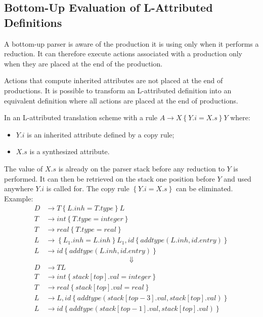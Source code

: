 \subsection{Bottom-Up Evaluation of L-Attributed Definitions}
A bottom-up parser is aware of the production it is using only when it performs a reduction.
It can therefore execute actions associated with a production only when they are placed at the end of the production.

Actions that compute inherited attributes are not placed at the end of productions.
It is possible to transform an L-attributed definition into an equivalent definition where all actions are placed at the end of productions.

In an L-attributed translation scheme with a rule $A \to X\left\{Y.i = X.s\right\}Y$ where:
\begin{itemize}
	\item $Y.i$ is an inherited attribute defined by a copy rule;
	\item $X.s$ is a synthesized attribute.
\end{itemize}
The value of $X.s$ is already on the parser stack before any reduction to $Y$ is performed.
It can then be retrieved on the stack one position before $Y$ and used anywhere $Y.i$ is called for.
The copy rule $\left\{Y.i = X.s\right\}$ can be eliminated.
Example:
\begin{align*}
	D &\to T \left\{L.inh = T.type\right\}L \\
	T &\to int \left\{T.type = integer\right\} \\
	T &\to real \left\{T.type = real\right\} \\
	L &\to \left\{L_1.inh = L.inh\right\}L_1, id\left\{addtype(L.inh, id.entry)\right\} \\
	L &\to id \left\{addtype(L.inh, id.entry)\right\}
\end{align*}
$$
	\Downarrow
$$
\begin{align*}
	D &\to TL \\
	T &\to int \left\{stack[top].val = integer\right\} \\
	T &\to real \left\{stack[top].val = real\right\} \\
	L &\to L, id \left\{addtype(stack[top - 3].val, stack[top].val)\right\} \\
	L &\to id \left\{addtype(stack[top - 1].val, stack[top].val)\right\} 
\end{align*}

